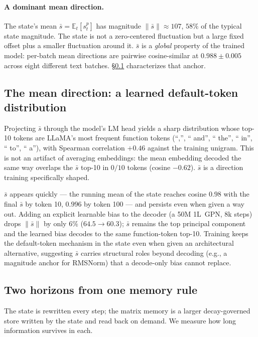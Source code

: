 \documentclass{article}
\begin{document}
\paragraph{A dominant mean direction.} The state's mean
$\bar s = \mathbb{E}_t[s^p_t]$ has magnitude $\|\bar s\| \approx 107$,
$58\%$ of the typical state magnitude. The state is not a
zero-centered fluctuation but a large fixed offset plus a smaller
fluctuation around it. $\bar s$ is a \emph{global} property of the
trained model: per-batch mean directions are pairwise cosine-similar
at $0.988 \pm 0.005$ across eight different text batches.
\S\ref{sec:dc} characterizes that anchor.

\FloatBarrier

\subsection{The mean direction: a learned default-token distribution}
\label{sec:dc}

Projecting $\bar s$ through the model's LM head yields a sharp
distribution whose top-10 tokens are LLaMA's most frequent function
tokens (``,'', `` and'', `` the'', `` in'', `` to'', `` a''), with
Spearman correlation $+0.46$ against the training unigram. This is
not an artifact of averaging embeddings: the mean embedding decoded
the same way overlaps the $\bar s$ top-10 in $0/10$ tokens
(cosine $-0.62$). $\bar s$ is a direction training specifically
shaped.

$\bar s$ appears quickly --- the running mean of the state reaches
cosine $0.98$ with the final $\bar s$ by token 10, $0.996$ by token
100 --- and persists even when given a way out. Adding an explicit
learnable bias to the decoder (a 50M 1L~GPN, 8k steps) drops
$\|\bar s\|$ by only $6\%$ ($64.5 \to 60.3$); $\bar s$ remains the
top principal component and the learned bias decodes to the same
function-token top-10. Training keeps the default-token mechanism
in the state even when given an architectural alternative,
suggesting $\bar s$ carries structural roles beyond decoding (e.g.,
a magnitude anchor for RMSNorm) that a decode-only bias cannot
replace.

\FloatBarrier

\subsection{Two horizons from one memory rule}
\label{sec:horizon}

The state is rewritten every step; the matrix memory is a larger
decay-governed store written by the state and read back on demand.
We measure how long information survives in each.
\end{document}
